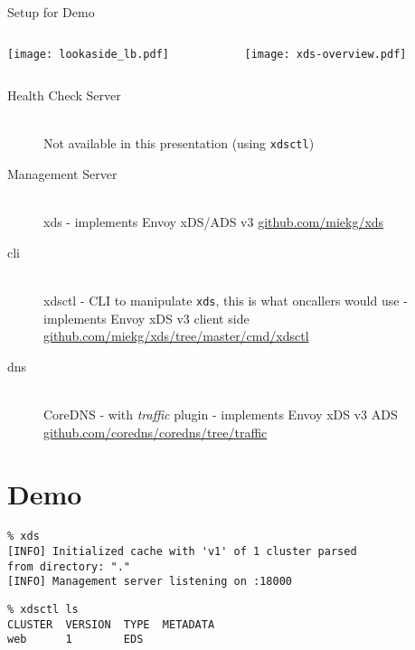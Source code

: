 \documentclass[aspectratio=169]{beamer}
\begin{document}
    \begin{frame}{Setup for Demo}
        \begin{columns}[T]
            \begin{column}{0.2\textwidth}
                \texttt{[image: lookaside\_lb.pdf]}
            \end{column}
            \begin{column}{0.8\textwidth}
                \texttt{[image: xds-overview.pdf]}
            \end{column}
        \end{columns}
    \end{frame}

    \begin{frame}{}
        \begin{description}
            \item[Health Check Server]\ \\
                 Not available in this presentation (using \texttt{xdsctl})
            \item[Management Server]\ \\
                 xds - implements Envoy xDS/ADS v3 \url{github.com/miekg/xds}
            \item[cli]\ \\
                 xdsctl - CLI to manipulate \texttt{xds}, this is what oncallers would use -
                 implements Envoy xDS v3 client side \url{github.com/miekg/xds/tree/master/cmd/xdsctl}
            \item[dns]\ \\
                 CoreDNS - with \emph{traffic} plugin -
                 implements Envoy xDS v3 ADS \url{github.com/coredns/coredns/tree/traffic}
        \end{description}
    \end{frame}

    \section{Demo}
    \begin{frame}[fragile]
        \begin{verbatim}
% xds
[INFO] Initialized cache with 'v1' of 1 cluster parsed
from directory: "."
[INFO] Management server listening on :18000
        \end{verbatim}

        \begin{verbatim}
% xdsctl ls
CLUSTER  VERSION  TYPE  METADATA
web      1        EDS
        \end{verbatim}
    \end{frame}
\end{document}
